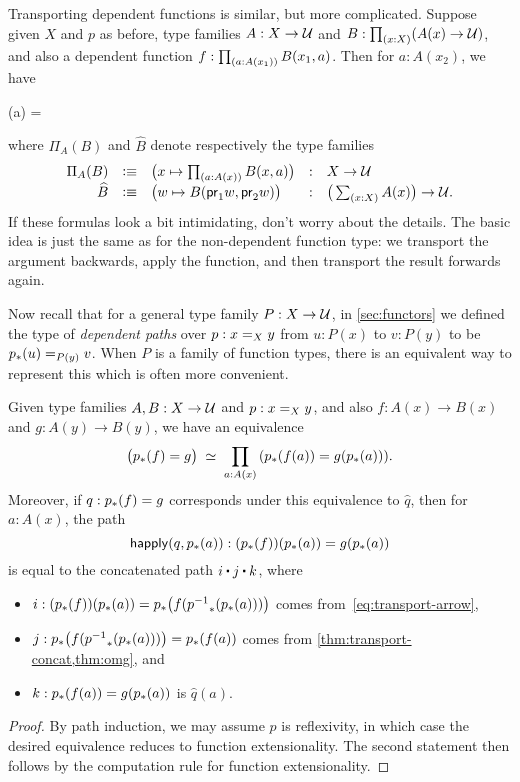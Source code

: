 %
Transporting dependent functions is similar, but more complicated.
Suppose given $X$ and $p$ as before, type families $A:X\to \type$ and $B:\prd{x:X} (A(x)\to\type)$, and also a dependent function $f : \prd{a:A(x_1)} B(x_1,a)$.
Then for $a:A(x_2)$, we have
\begin{narrowmultline*}
  (a) = \narrowbreak
\end{narrowmultline*}
where $\Pi_A(B)$ and $\widehat{B}$ denote respectively the type families
\begin{equation}\label{eq:transport-arrow-families}
\begin{array}{rclcl}
\Pi_A(B) &\defeq& \big(x\mapsto \prd{a:A(x)} B(x,a) \big) &:& X\to \type\\
\widehat{B} &\defeq& \big(w \mapsto B(\proj1w,\proj2w) \big) &:& \big(\sm{x:X} A(x)\big) \to \type.
\end{array}
\end{equation}
If these formulas look a bit intimidating, don't worry about the details.
The basic idea is just the same as for the non-dependent function type: we transport the argument backwards, apply the function, and then transport the result forwards again.

Now recall that for a general type family $P:X\to\type$, in \cref{sec:functors} we defined the type of \emph{dependent paths} over $p:\id[X]xy$ from $u:P(x)$ to $v:P(y)$ to be $\id[P(y)]{\trans{p}{u}}{v}$.
When $P$ is a family of function types, there is an equivalent way to represent this which is often more convenient.

\begin{lem}\label{thm:dpath-arrow}
  Given type families $A,B:X\to\type$ and $p:\id[X]xy$, and also $f:A(x)\to B(x)$ and $g:A(y)\to B(y)$, we have an equivalence
  \[ \eqvspaced{ \big(\trans{p}{f} = {g}\big) } { \prd{a:A(x)}  (\trans{p}{f(a)} = g(\trans{p}{a})) }. \]
  Moreover, if $q:\trans{p}{f} = {g}$ corresponds under this equivalence to $\widehat q$, then for $a:A(x)$, the path
  \[ \happly(q,\trans p a) : (\trans p f)(\trans p a) = g(\trans p a)\]
  is equal to the concatenated path $i\ct j\ct k$, where
  \begin{itemize}
  \item $i:(\trans p f)(\trans p a) = \trans p {f (\trans {\opp p}{\trans p a})}$ comes from~\eqref{eq:transport-arrow},
  \item $j:\trans p {f (\trans {\opp p}{\trans p a})} = \trans p {f(a)}$ comes from \cref{thm:transport-concat,thm:omg}, and
  \item $k:\trans p {f(a)}= g(\trans p a)$ is $\widehat{q}(a)$.
  \end{itemize}
\end{lem}
\begin{proof}
  By path induction, we may assume $p$ is reflexivity, in which case the desired equivalence reduces to function extensionality.
  The second statement then follows by the computation rule for function extensionality.
\end{proof}

